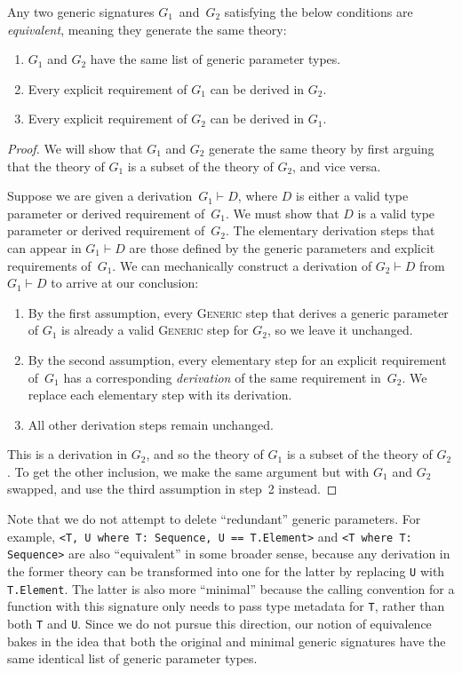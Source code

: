 \documentclass[../generics]{subfiles}
\begin{document}
\begin{proposition}\label{equiv generic signatures}
Any two generic signatures $G_1$~and~$G_2$ satisfying the below conditions are \emph{equivalent}, meaning they generate the same theory:
\begin{enumerate}
\item $G_1$ and $G_2$ have the same list of generic parameter types.
\item Every explicit requirement of $G_1$ can be derived in $G_2$.
\item Every explicit requirement of $G_2$ can be derived in $G_1$.
\end{enumerate}
\end{proposition}
\begin{proof}
We will show that $G_1$ and $G_2$ generate the same theory by first arguing that the theory of $G_1$ is a subset of the theory of $G_2$, and vice versa.

Suppose we are given a derivation~$G_1\vdash D$, where $D$ is either a valid type parameter or derived requirement of~$G_1$. We must show that $D$ is a valid type parameter or derived requirement of~$G_2$. The elementary derivation steps that can appear in $G_1\vdash D$ are those defined by the generic parameters and explicit requirements of~$G_1$. We can mechanically construct a derivation of $G_2\vdash D$ from $G_1\vdash D$ to arrive at our conclusion:
\begin{enumerate}
\item By the first assumption, every \textsc{Generic} step that derives a generic parameter of $G_1$ is already a valid \textsc{Generic} step for $G_2$, so we leave it unchanged.
\item By the second assumption, every elementary step for an explicit requirement of~$G_1$ has a corresponding \emph{derivation} of the same requirement in~$G_2$. We replace each elementary step with its derivation.
\item All other derivation steps remain unchanged.
\end{enumerate}
This is a derivation in $G_2$, and so the theory of $G_1$ is a subset of the theory of $G_2$. To get the other inclusion, we make the same argument but with $G_1$ and $G_2$ swapped, and use the third assumption in step~2 instead.
\end{proof}

Note that we do not attempt to delete ``redundant'' generic parameters. For example, \verb|<T, U where T: Sequence, U == T.Element>| and \verb|<T where T: Sequence>| are also ``equivalent'' in some broader sense, because any derivation in the former theory can be transformed into one for the latter by replacing \verb|U| with \verb|T.Element|. The latter is also more ``minimal'' because the calling convention for a function with this signature only needs to pass type metadata for \texttt{T}, rather than both \texttt{T} and \texttt{U}. Since we do not pursue this direction, our notion of equivalence bakes in the idea that both the original and minimal generic signatures have the same identical list of generic parameter types.
\end{document}
